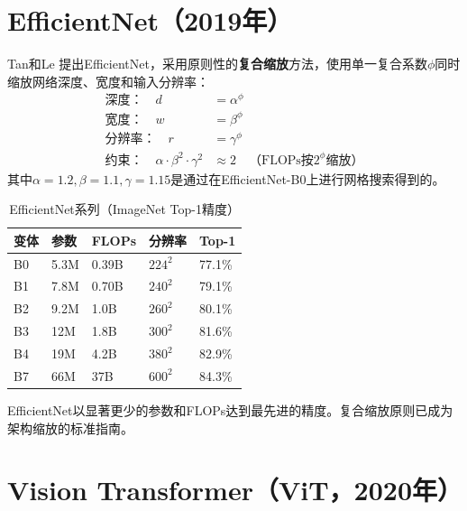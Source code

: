 \section{EfficientNet（2019年）}

Tan和Le \cite{tan2019efficientnet}提出EfficientNet，采用原则性的\textbf{复合缩放}方法，使用单一复合系数$\phi$同时缩放网络深度、宽度和输入分辨率：
\begin{align}
\text{深度：} \quad d &= \alpha^\phi \\
\text{宽度：} \quad w &= \beta^\phi \\
\text{分辨率：} \quad r &= \gamma^\phi \\
\text{约束：} \quad \alpha \cdot \beta^2 \cdot \gamma^2 &\approx 2 \quad \text{（FLOPs按$2^\phi$缩放）}
\end{align}
其中$\alpha=1.2, \beta=1.1, \gamma=1.15$是通过在EfficientNet-B0上进行网格搜索得到的。

\begin{table}[ht]
    \centering
    \caption{EfficientNet系列（ImageNet Top-1精度）}
    \begin{tabular}{L{2cm} L{2cm} L{2cm} L{3cm} L{2.5cm}}
        \toprule
        \textbf{变体} & \textbf{参数} & \textbf{FLOPs} & \textbf{分辨率} & \textbf{Top-1} \\
        \midrule
        B0 & 5.3M & 0.39B & $224^2$ & 77.1\% \\
        B1 & 7.8M & 0.70B & $240^2$ & 79.1\% \\
        B2 & 9.2M & 1.0B & $260^2$ & 80.1\% \\
        B3 & 12M & 1.8B & $300^2$ & 81.6\% \\
        B4 & 19M & 4.2B & $380^2$ & 82.9\% \\
        B7 & 66M & 37B & $600^2$ & 84.3\% \\
        \bottomrule
    \end{tabular}
\end{table}

EfficientNet以显著更少的参数和FLOPs达到最先进的精度。复合缩放原则已成为架构缩放的标准指南。

\section{Vision Transformer（ViT，2020年）}

